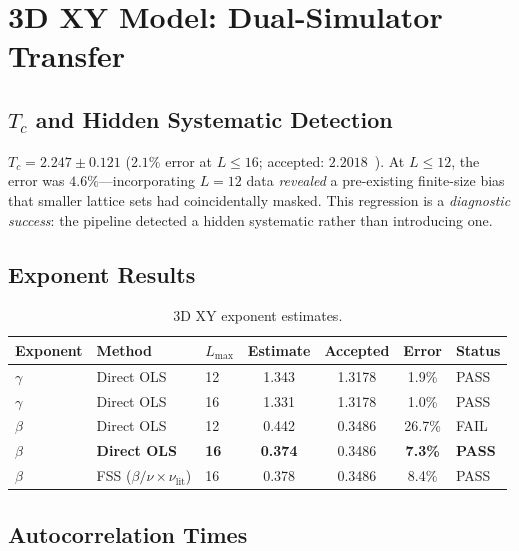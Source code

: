 \documentclass[11pt,a4paper]{article}
\begin{document}
\section{3D XY Model: Dual-Simulator Transfer}\label{sec:xy}

\subsection{\texorpdfstring{$T_c$}{Tc} and Hidden Systematic Detection}

$T_c = 2.247 \pm 0.121$ ($2.1\%$ error at $L \leq 16$; accepted: $2.2018$~\cite{campostrini2006}). At $L \leq 12$, the error was $4.6\%$---incorporating $L = 12$ data \emph{revealed} a pre-existing finite-size bias that smaller lattice sets had coincidentally masked. This regression is a \emph{diagnostic success}: the pipeline detected a hidden systematic rather than introducing one.

\subsection{Exponent Results}

\begin{table}[ht]
\centering
\caption{3D XY exponent estimates.}
\label{tab:xy}
\begin{tabular}{@{}lllcccl@{}}
\toprule
Exponent & Method & $L_{\max}$ & Estimate & Accepted & Error & Status \\
\midrule
$\gamma$ & Direct OLS & 12 & 1.343 & 1.3178 & 1.9\% & PASS \\
$\gamma$ & Direct OLS & 16 & 1.331 & 1.3178 & 1.0\% & PASS \\
$\beta$ & Direct OLS & 12 & 0.442 & 0.3486 & 26.7\% & FAIL \\
$\beta$ & \textbf{Direct OLS} & \textbf{16} & \textbf{0.374} & 0.3486 & \textbf{7.3\%} & \textbf{PASS} \\
$\beta$ & FSS ($\beta/\nu\times\nu_{\text{lit}}$) & 16 & 0.378 & 0.3486 & 8.4\% & PASS \\
\bottomrule
\end{tabular}
\end{table}

\subsection{Autocorrelation Times}
\end{document}
